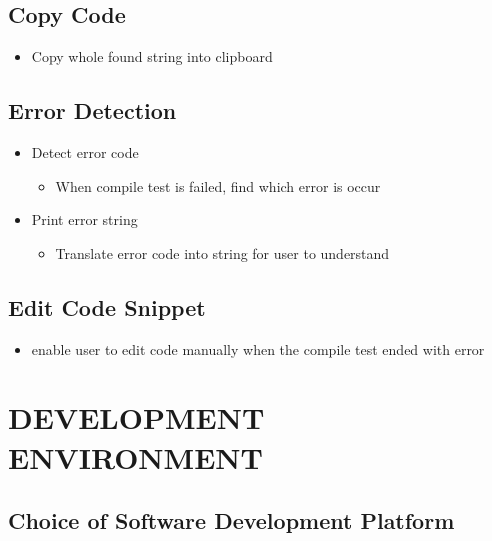 \documentclass[conference]{IEEEtran}
\begin{document}
\begin{itemize}
\begin{itemize}
\begin{itemize}
\begin{itemize}
\subsection{Copy Code}
  \begin{itemize}
    \item Copy whole found string into clipboard
  \end{itemize}
\textit{ }


\subsection{Error Detection}
\begin{itemize}
  \item Detect error code
  \begin{itemize}
    \item When compile test is failed, find which error is occur
  \end{itemize}
  \item Print error string
  \begin{itemize}
    \item Translate error code into string for user to understand
  \end{itemize}
\end{itemize}
\textit{ }


\subsection{Edit Code Snippet}
  \begin{itemize}
    \item enable user to edit code manually when the compile test ended with error
  \end{itemize}
\textit{ }


\section{DEVELOPMENT ENVIRONMENT} %
\label{sec:development_environment}
\subsection{Choice of Software Development Platform} %
\label{sub:choice_of_software_development_platform}


\end{itemize}
\end{itemize}
\end{itemize}
\end{itemize}
\end{document}
